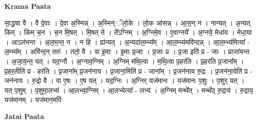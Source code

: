 \documentclass[17pt]{extarticle}
\begin{document}
\textbf{Krama Paata} \newline

सा॒द्ध्या वै । वै दे॒वाः । दे॒वा अ॒स्मिन्न् । अ॒स्मिन् ॅलो॒के । लो॒क आ॑सन्न् । आ॒स॒न् न । नान्यत् । अ॒न्यत् किम् । किम् च॒न । च॒न मि॒षत् । मि॒षत् ते । ते᳚ऽग्निम् । अ॒ग्निमे॒व । ए॒वाग्नये᳚ । अ॒ग्नये॒ मेधा॑य । मेधा॒या । आऽल॑भन्त । अ॒ल॒भ॒न्त॒ न । न हि । ह्य॑न्यत् । अ॒न्यदा॑ल॒म्भ्य᳚म् । आ॒ल॒म्भ्य॑मवि॑न्दन्न् । आ॒ल॒म्भ्य॑मित्या᳚ - ल॒म्भ्य᳚म् । अवि॑न्द॒न् ततः॑ । ततो॒ वै । वा इ॒माः । इ॒माः प्र॒जाः । प्र॒जाः प्र । प्र॒जा इति॑ प्र - जाः । प्राजा॑यन्त । अ॒जा॒य॒न्त॒ यत् । यद॒ग्नौ । अ॒ग्नाव॒ग्निम् । अ॒ग्निम् म॑थि॒त्वा । म॒थि॒त्वा प्र॒हर॑ति । प्र॒हर॑ति प्र॒जाना᳚म् । प्र॒हर॒तीति॑ प्र - हर॑ति । प्र॒जाना᳚म् प्र॒जन॑नाय । प्र॒जाना॒मिति॑ प्र - जाना᳚म् । प्र॒जन॑नाय रु॒द्रः । प्र॒जन॑ना॒येति॑ प्र - जन॑नाय । रु॒द्रो वै । वा ए॒षः । ए॒ष यत् । यद॒ग्निः । अ॒ग्निर् यज॑मानः । यज॑मानः प॒शुः । प॒शुर् यत् । यत् प॒शुम् । प॒शुमा॒लभ्य॑ । आ॒लभ्या॒ग्निम् । आ॒लभ्येत्या᳚ - लभ्य॑ । अ॒ग्निम् मन्थे᳚त् । मन्थे᳚द् रु॒द्राय॑ । रु॒द्राय॒ यज॑मानम् । यज॑मान॒मपि॑ \newline

\textbf{Jatai Paata} \newline
\end{document}

